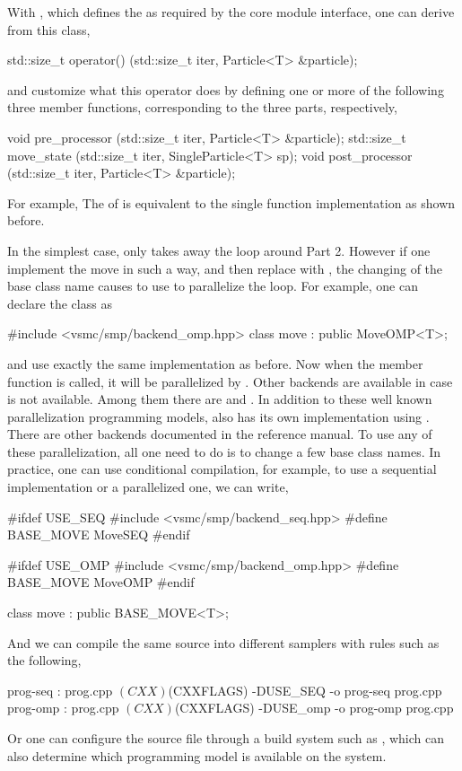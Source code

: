 With , which defines the  as
required by the core module interface, one can derive from this class,
\begin{cppcode}
std::size_t operator() (std::size_t iter, Particle<T> &particle);
\end{cppcode}
and customize what this operator does by defining one or more of the following
three member functions, corresponding to the three parts, respectively,
\begin{cppcode}
void pre_processor (std::size_t iter, Particle<T> &particle);
std::size_t move_state (std::size_t iter, SingleParticle<T> sp);
void post_processor (std::size_t iter, Particle<T> &particle);
\end{cppcode}
For example,
The  of  is equivalent to the
single function implementation as shown before.

In the simplest case,  only takes away the loop around Part
2. However if one implement the move in such a way, and then replace
 with , the changing of the base class
name causes \vsmc to use \openmp to parallelize the loop. For example, one can
declare the class as
\begin{cppcode}
#include <vsmc/smp/backend_omp.hpp>
class move : public MoveOMP<T>;
\end{cppcode}
and use exactly the same implementation as before. Now when the member
function  is called, it will be parallelized by
\openmp. Other backends are available in case \openmp is not available. Among
them there are \cilk and \tbb. In addition to these well known parallelization
programming models, \vsmc also has its own implementation using \cppoo{}
. There are other backends documented in the reference
manual. To use any of these parallelization, all one need to do is to change a
few base class names. In practice, one can use conditional compilation, for
example, to use a sequential implementation or a \openmp parallelized one, we
can write,
\begin{cppcode}
#ifdef USE_SEQ
#include <vsmc/smp/backend_seq.hpp>
#define BASE_MOVE MoveSEQ
#endif

#ifdef USE_OMP
#include <vsmc/smp/backend_omp.hpp>
#define BASE_MOVE MoveOMP
#endif

class move : public BASE_MOVE<T>;
\end{cppcode}
And we can compile the same source into different samplers with
 rules such as the following,
\begin{makecode}
prog-seq : prog.cpp
        $(CXX) $(CXXFLAGS) -DUSE_SEQ -o prog-seq prog.cpp
prog-omp : prog.cpp
        $(CXX) $(CXXFLAGS) -DUSE_omp -o prog-omp prog.cpp
\end{makecode}
Or one can configure the source file through a build system such as \cmake,
which can also determine which programming model is available on the system.

